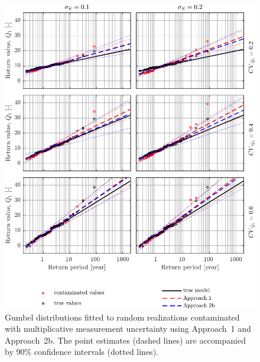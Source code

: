 \begin{figure}[htbp!] 
	\centering    
	\includegraphics[]{Gumbel_prod_me_smallm_50_rng14.pdf}
	\caption{Gumbel distributions fitted to random realizations contaminated with multiplicative measurement uncertainty using Approach~1 and Approach~2b. The point estimates (dashed lines) are accompanied by 90\% confidence intervals (dotted lines).}
	\label{fig:Gumbel_prod_me_smallm}
\end{figure}

